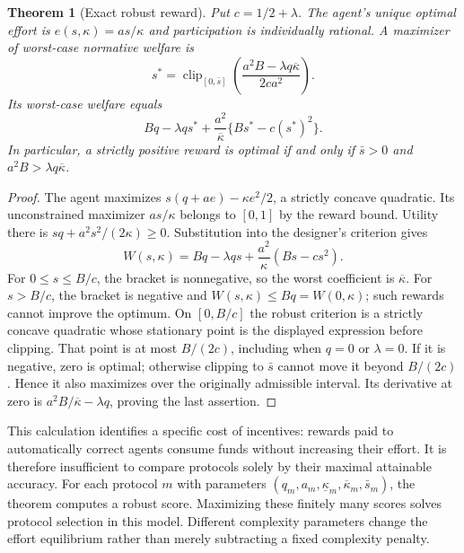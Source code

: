 \documentclass[11pt]{article}
\newtheorem{theorem}{Theorem}
\theoremstyle{remark}\newtheorem{remark}[theorem]{Remark}
\newcommand{\clip}{\operatorname{clip}}
\begin{document}
\begin{theorem}[Exact robust reward]
Put $c=1/2+\lambda$. The agent's unique optimal effort is $e(s,\kappa)=as/\kappa$ and participation is individually rational. A maximizer of worst-case normative welfare is
\[
 s^*=\clip_{[0,\bar s]}\left(\frac{a^2B-\lambda q\overline\kappa}{2ca^2}\right).
\]
Its worst-case welfare equals
\[
 Bq-\lambda q s^*+
 \frac{a^2}{\overline\kappa}\{Bs^*-c(s^*)^2\}.
\]
In particular, a strictly positive reward is optimal if and only if $\bar s>0$ and $a^2B>\lambda q\overline\kappa$.
\end{theorem}
\begin{proof}
The agent maximizes $s(q+ae)-\kappa e^2/2$, a strictly concave quadratic. Its unconstrained maximizer $as/\kappa$ belongs to $[0,1]$ by the reward bound. Utility there is $sq+a^2s^2/(2\kappa)\ge0$.
Substitution into the designer's criterion gives
\[
 W(s,\kappa)=Bq-\lambda qs+\frac{a^2}{\kappa}(Bs-cs^2).
\]
For $0\le s\le B/c$, the bracket is nonnegative, so the worst coefficient is $\overline\kappa$. For $s>B/c$, the bracket is negative and $W(s,\kappa)\le Bq=W(0,\kappa)$; such rewards cannot improve the optimum. On $[0,B/c]$ the robust criterion is a strictly concave quadratic whose stationary point is the displayed expression before clipping. That point is at most $B/(2c)$, including when $q=0$ or $\lambda=0$. If it is negative, zero is optimal; otherwise clipping to $\bar s$ cannot move it beyond $B/(2c)$. Hence it also maximizes over the originally admissible interval. Its derivative at zero is $a^2B/\overline\kappa-\lambda q$, proving the last assertion.
\end{proof}

This calculation identifies a specific cost of incentives: rewards paid to automatically correct agents consume funds without increasing their effort. It is therefore insufficient to compare protocols solely by their maximal attainable accuracy. For each protocol $m$ with parameters $(q_m,a_m,\underline\kappa_m,\overline\kappa_m,\bar s_m)$, the theorem computes a robust score. Maximizing these finitely many scores solves protocol selection in this model. Different complexity parameters change the effort equilibrium rather than merely subtracting a fixed complexity penalty.
\end{document}
